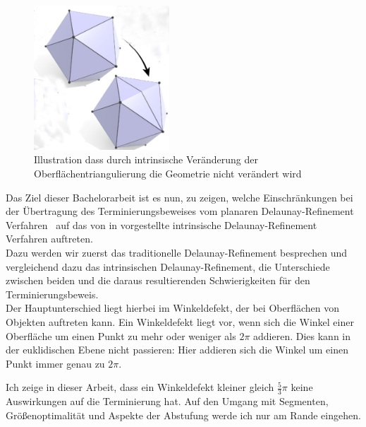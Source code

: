 \begin{figure}[H]%
    
    \centering
    \includegraphics[width=2in]{images/intrinsch_kantenflip.jpg}
  \caption{Illustration  dass durch intrinsische Veränderung der Oberflächentriangulierung  die Geometrie nicht verändert wird~\cite{Sharp:2019:NIT}}
  \label{fig:intrinischer_kanten_flip}
\end{figure}
\newpage
Das Ziel dieser Bachelorarbeit ist es nun, zu zeigen, welche Einschränkungen bei der Übertragung des Terminierungsbeweises vom planaren Delaunay-Refinement  Verfahren~\cite{chew:1989:guaranteed,ruppert:1995:delaunay,SHEWCHUK:2002:chuws} auf das von  \citeauthor{Sharp:2019:NIT} in   \cite{Sharp:2019:NIT}  vorgestellte intrinsische Delaunay-Refinement  Verfahren auftreten.\\ Dazu werden wir zuerst das traditionelle Delaunay-Refinement  besprechen und vergleichend dazu das intrinsischen Delaunay-Refinement, die Unterschiede zwischen beiden und die daraus resultierenden Schwierigkeiten für den Terminierungsbeweis.\\ 


Der Hauptunterschied liegt hierbei im Winkeldefekt, der bei Oberflächen von Objekten auftreten kann. Ein Winkeldefekt liegt vor, wenn sich die Winkel einer Oberfläche um einen Punkt zu mehr oder weniger als $2\pi$ addieren. Dies kann in der euklidischen Ebene nicht passieren: Hier addieren sich die Winkel um einen Punkt immer genau zu $2\pi$.



Ich zeige in dieser Arbeit, dass ein Winkeldefekt kleiner gleich $\frac{5}{3}\pi$ keine Auswirkungen auf die Terminierung hat. Auf den Umgang mit Segmenten, Größenoptimalität und Aspekte der Abstufung werde ich nur am Rande eingehen.\\










